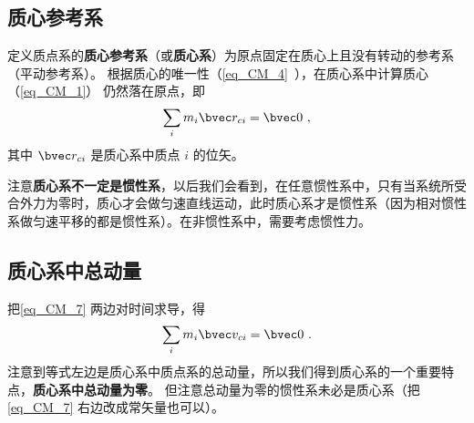 

\subsection{质心参考系}\label{sub_CM_2}
定义质点系的\textbf{质心参考系}（或\textbf{质心系}）为原点固定在质心上且没有转动的参考系（平动参考系）。%
根据质心的唯一性（\autoref{eq_CM_4}~），在质心系中计算质心（\autoref{eq_CM_1}） 仍然落在原点，即
\begin{equation}\label{eq_CM_7}
\sum_i m_i \bvec r_{ci} = \bvec 0~,
\end{equation}
其中 $\bvec r_{ci}$ 是质心系中质点 $i$ 的位矢。

注意\textbf{质心系不一定是惯性系}，以后我们会看到，在任意惯性系中，只有当系统所受合外力为零时，质心才会做匀速直线运动，此时质心系才是惯性系（因为相对惯性系做匀速平移的都是惯性系）。在非惯性系中，需要考虑惯性力。

\subsection{质心系中总动量}
把\autoref{eq_CM_7} 两边对时间求导，得
\begin{equation}\label{eq_CM_8}
\sum_i m_i \bvec v_{ci} = \bvec 0~.
\end{equation}
注意到等式左边是质心系中质点系的总动量，所以我们得到质心系的一个重要特点，\textbf{质心系中总动量为零}。 但注意总动量为零的惯性系未必是质心系（把\autoref{eq_CM_7} 右边改成常矢量也可以）。

